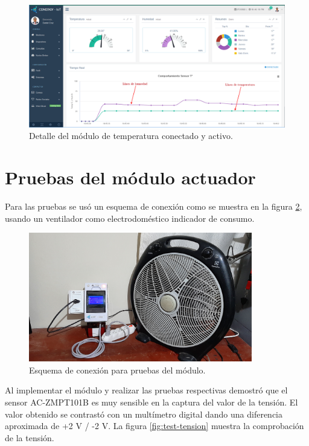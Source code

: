 \begin{landscape} %
\begin{figure}[htpb]
\centering 
\includegraphics[width=1.7\textwidth]{./Figures/test/temp/detalle.png}
\caption{Detalle del módulo de temperatura conectado y activo.}
\label{fig:temp-detalle}
\end{figure}
\end{landscape} %

\section{Pruebas del módulo actuador}
Para las pruebas se usó un esquema de conexión como se muestra en la figura \ref{fig:test-esquema}, usando un ventilador como electrodoméstico indicador de consumo. 
\vspace{0.5cm}
\begin{figure}[htpb]
\centering 
\includegraphics[width=0.87\textwidth]{./Figures/test/consumo/esquema.png}
\caption{Esquema de conexión para pruebas del módulo.}
\label{fig:test-esquema}
\end{figure}

Al implementar el módulo y realizar las pruebas respectivas demostró que el sensor AC-ZMPT101B es muy sensible en la captura del valor de la tensión. El valor obtenido se contrastó con un multímetro digital dando una diferencia aproximada de +2 V / -2 V. La figura \ref{fig:test-tension} muestra la comprobación de la tensión.


